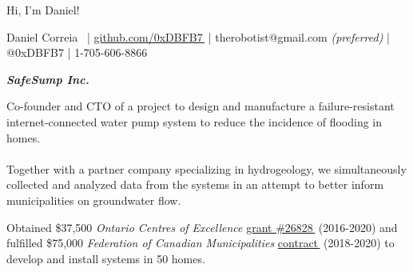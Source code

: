 \documentclass[fleqn,11pt]{article}
\newcommand{\ressection}[1]{\textbf{{\Large \textit{#1}}}\xrfill[0.1ex]{0.6pt}}
\begin{document}
%
%
%
%
%
%
%
%
%
%
%
%


\begingroup
{}\selectfont

{\Huge Hi, I'm Daniel!}

\endgroup


\begin{center}
\small{{Daniel Correia}\  
	\let\orighref\href%
	\renewcommand{\href}[2]{\orighref{#1}{#2\,{\footnotesize{\faExternalLink}}}}
	| \href{https://github.com/0xDBFB7}{github.com/0xDBFB7} | therobotist@gmail.com \textit{(preferred)} | @0xDBFB7 | 1-705-606-8866}\\
\end{center}

\let\orighref\href%
\renewcommand{\href}[2]{\orighref{#1}{#2\,{\footnotesize{\faExternalLink}}}}


\ressection{SafeSump Inc.}

Co-founder and CTO of a project to design and manufacture a failure-resistant internet-connected water pump system to reduce the incidence of flooding in homes.\\\\ Together with a partner company specializing in hydrogeology, we simultaneously collected and analyzed data from the systems in an attempt to better inform municipalities on groundwater flow.%

Obtained \$37,500 \textit{Ontario Centres of Excellence} \href{https://drive.google.com/file/d/1WXrxVwTggaL7WEvLv6DgJ891fSo7LqqP/view?usp=sharing}{grant \#26828} (2016-2020) and fulfilled \$75,000 \textit{Federation of Canadian Municipalities} \href{https://drive.google.com/file/d/11pdJNzYDE-28X3m0rH8mE4cxoliTJZGH/view?usp=sharing}{contract} (2018-2020) to develop and install systems in 50 homes.
\end{document}
